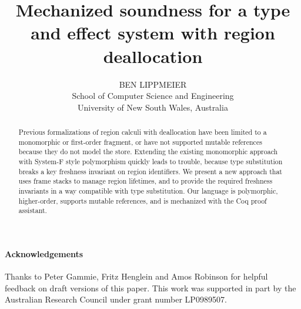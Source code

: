 \documentclass{jfp}
\begin{document}
\title  [Mechanized soundness for a type and effect system with region deallocation ]
        {Mechanized soundness for a type and effect system with region deallocation}

\author [Ben Lippmeier]
        {  BEN LIPPMEIER \\
           School of Computer Science and Engineering \\
           University of New South Wales, Australia
        }

\maketitle

\makeatactive
\begin{abstract}
Previous formalizations of region calculi with deallocation have been limited to a monomorphic or first-order fragment, or have not supported mutable references because they do not model the store. Extending the existing monomorphic approach with System-F style polymorphism quickly leads to trouble, because type substitution breaks a key freshness invariant on region identifiers. We present a new approach that uses frame stacks to manage region lifetimes, and to provide the required freshness invariants in a way compatible with type substitution. Our language is polymorphic, higher-order, supports mutable references, and is mechanized with the Coq proof assistant.
\end{abstract}








\paragraph{Acknowledgements}
Thanks to Peter Gammie, Fritz Henglein and Amos Robinson for helpful feedback on draft versions of this paper. This work was supported in part by the Australian Research Council under grant number LP0989507.



\end{document}
